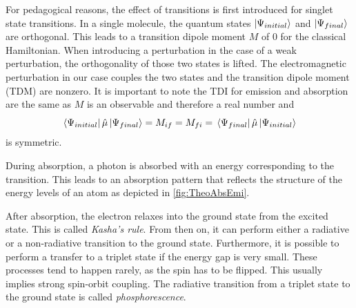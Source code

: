 For pedagogical reasons, the effect of transitions is first introduced for singlet state transitions. In a single molecule, the quantum states $\ket{\Psi_{initial}}$ and $\ket{\Psi_{final}}$ are orthogonal. This leads to a transition dipole moment $M$ of 0 for the classical Hamiltonian. When introducing a perturbation in the case of a weak perturbation, the orthogonality of those two states is lifted. The electromagnetic perturbation in our case couples the two states and the transition dipole moment (TDM) are nonzero. It is important to note the TDI for emission and absorption are the same as $M$ is an observable and therefore a real number and
\begin{equation}
    \bra*{\Psi_{initial}}\hat\mu\ket*{\Psi_{final}} = M_{if} = M_{fi} = \bra*{\Psi_{final}}\hat\mu\ket*{\Psi_{initial}}
\end{equation}
is symmetric.

During absorption, a photon is absorbed with an energy corresponding to the transition. This leads to an 
absorption pattern that reflects the structure of the energy levels of an atom as depicted in \cref*{fig:TheoAbsEmi}.

After absorption, the electron relaxes into the ground state from the excited state. This is called \textit{Kasha's rule}. From then on, it can perform either a radiative or a non-radiative transition to the ground state. Furthermore, it is possible to perform a transfer to a triplet state if the energy gap is very small. These processes tend to happen rarely, as the spin has to be flipped. This usually implies strong spin-orbit coupling. The radiative transition from a triplet state to the ground state is called \textit{phosphorescence}.




